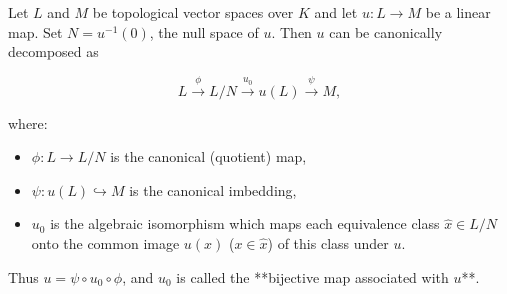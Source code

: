 Let $L$ and $M$ be topological vector spaces over $K$ and let $u: L \to M$ be a linear map. Set $N = u^{-1}(0)$, the null space of $u$. Then $u$ can be canonically decomposed as

$$L \xrightarrow{\phi} L/N \xrightarrow{u_0} u(L) \xrightarrow{\psi} M,$$

where:
\begin{itemize}
\item $\phi: L \to L/N$ is the canonical (quotient) map,
\item $\psi: u(L) \hookrightarrow M$ is the canonical imbedding,
\item $u_0$ is the algebraic isomorphism which maps each equivalence class $\hat{x} \in L/N$ onto the common image $u(x)$ ($x \in \hat{x}$) of this class under $u$.
\end{itemize}

Thus $u = \psi \circ u_0 \circ \phi$, and $u_0$ is called the **bijective map associated with $u$**.
